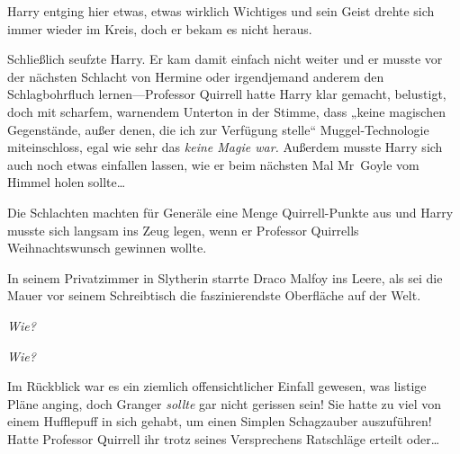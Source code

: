 Harry entging hier etwas, etwas wirklich Wichtiges und sein Geist drehte sich immer wieder im Kreis, doch er bekam es nicht heraus.

Schließlich seufzte Harry. Er kam damit einfach nicht weiter und er musste vor der nächsten Schlacht von Hermine oder irgendjemand anderem den Schlagbohrfluch lernen—Professor Quirrell hatte Harry klar gemacht, belustigt, doch mit scharfem, warnendem Unterton in der Stimme, dass „keine magischen Gegenstände, außer denen, die ich zur Verfügung stelle“ Muggel-Technologie miteinschloss, egal wie sehr das \emph{keine Magie war.} Außerdem musste Harry sich auch noch etwas einfallen lassen, wie er beim nächsten Mal Mr~Goyle vom Himmel holen sollte…%

Die Schlachten machten für Generäle eine Menge Quirrell-Punkte aus und Harry musste sich langsam ins Zeug legen, wenn er Professor Quirrells Weihnachtswunsch gewinnen wollte.

\later

In seinem Privatzimmer in Slytherin starrte Draco Malfoy ins Leere, als sei die Mauer vor seinem Schreibtisch die faszinierendste Oberfläche auf der Welt.

\emph{Wie?}

\emph{Wie?}

Im Rückblick war es ein ziemlich offensichtlicher Einfall gewesen, was listige Pläne anging, doch Granger \emph{sollte} gar nicht gerissen sein! Sie hatte zu viel von einem Hufflepuff in sich gehabt, um einen Simplen Schagzauber auszuführen! Hatte Professor Quirrell ihr trotz seines Versprechens Ratschläge erteilt oder…

